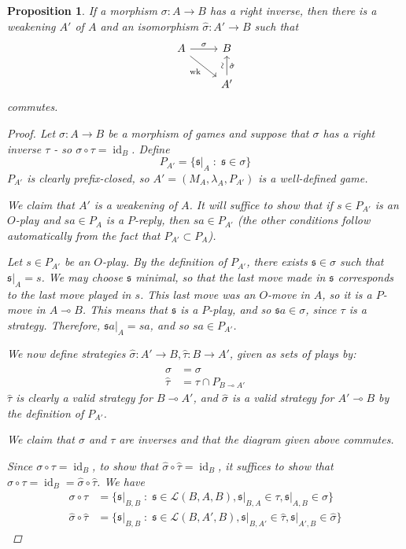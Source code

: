 \documentclass[11pt]{article} %
\theoremstyle{plain} %
\newtheorem{proposition}[theorem]{Proposition}
\theoremstyle{definition} %
\theoremstyle{exercisestyle}
\newcommand*\from{\colon}
\newcommand{\cmap}[3]{#1\from{}#2\to{}#3}
\DeclareMathOperator{\id}{id}
\renewcommand{\implies}{\multimap}
\newcommand{\comp}[2]{#1 \circ #2}
\newcommand{\suchthat}{\;\colon\;}
\renewcommand{\L}{\mathcal L}
\DeclareMathOperator{\wk}{wk}
\newcommand{\s}{\mathfrak{s}}
\begin{document}
\begin{proposition}
  If a morphism $\cmap{\sigma}{A}{B}$ has a right inverse, then there is a weakening $A'$ of $A$ and an isomorphism $\cmap{\hat{\sigma}}{A'}{B}$ such that
    \[
    \begin{tikzcd}
      A \arrow[r, "\sigma"] \arrow[dr, "\wk"']
        & B \arrow[d, leftarrow, "\rotatebox{90}{\(\sim\)}"', "\hat{\sigma}"] \\
        & A'
    \end{tikzcd}
    \]
    commutes.

    \begin{proof}
      Let $\cmap{\sigma}{A}{B}$ be a morphism of games and suppose that $\sigma$ has a right inverse $\tau$ - so $\comp\sigma\tau=\id_B$.  Define
      \[
        P_{A'}=\{\s\vert_A\suchthat \s\in\sigma\}
        \]
      $P_{A'}$ is clearly prefix-closed, so $A'=(M_A,\lambda_A,P_{A'})$ is a well-defined game.

      We claim that $A'$ is a weakening of $A$.  It will suffice to show that if $s\in P_{A'}$ is an $O$-play and $sa\in P_A$ is a $P$-reply, then $sa\in P_{A'}$ (the other conditions follow automatically from the fact that $P_{A'}\subset P_A$).  

      Let $s\in P_{A'}$ be an $O$-play.  By the definition of $P_{A'}$, there exists $\s\in \sigma$ such that $\s\vert_A=s$.  We may choose $\s$ minimal, so that the last move made in $\s$ corresponds to the last move played in $s$.  This last move was an $O$-move in $A$, so it is a $P$-move in $A\implies B$.  This means that $\s$ is a $P$-play, and so $\s a\in \sigma$, since $\tau$ is a strategy.  Therefore, $\s a\vert_A=sa$, and so $sa\in P_{A'}$.  

      We now define strategies $\cmap{\hat\sigma}{A'}{B}, \cmap{\hat\tau}{B}{A'}$, given as sets of plays by:
      \begin{align*}
        \hat\sigma & = \sigma \\
        \hat\tau & = \tau \cap P_{B\implies A'}
      \end{align*}
      $\hat\tau$ is clearly a valid strategy for $B\implies A'$, and $\hat\sigma$ is a valid strategy for $A'\implies B$ by the definition of $P_{A'}$.

      We claim that $\sigma$ and $\tau$ are inverses and that the diagram given above commutes.  

      Since $\comp\sigma\tau=\id_B$, to show that $\comp{\hat\sigma}{\hat\tau}=\id_B$, it suffices to show that $\comp\sigma\tau=\id_B=\comp{\hat\sigma}{\hat\tau}$.  We have
      \begin{align*}
        \comp\sigma\tau & = \{\s\vert_{B,B}\suchthat \s\in \L(B,A,B), \s\vert_{B,A}\in\tau,\s\vert_{A,B}\in\sigma\} \\
        \comp{\hat\sigma}{\hat\tau} & = \{\s\vert_{B,B}\suchthat \s\in \L(B,A',B), \s\vert_{B,A'}\in\hat\tau,\s\vert_{A',B}\in\hat\sigma\}
      \end{align*}


\end{proof}
\end{proposition}
\end{document}
